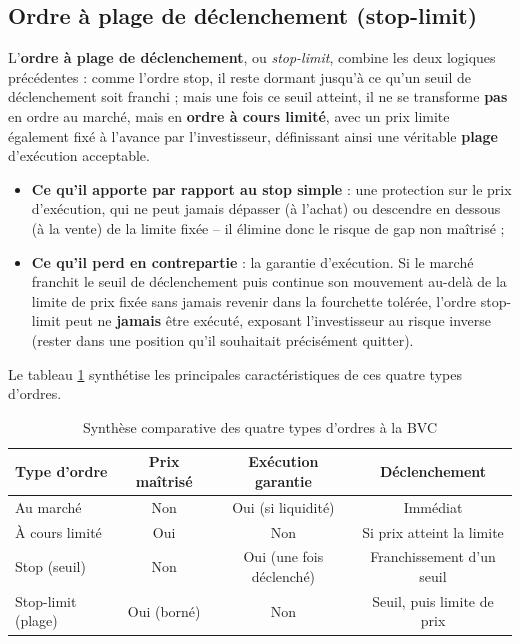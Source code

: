 \documentclass{rapportENSIAS} %
\begin{document}
\subsection{Ordre à plage de déclenchement (stop-limit)}

\noindent
L'\textbf{ordre à plage de déclenchement}, ou \textit{stop-limit}, combine les deux logiques précédentes : comme l'ordre stop, il reste dormant jusqu'à ce qu'un seuil de déclenchement soit franchi ; mais une fois ce seuil atteint, il ne se transforme \textbf{pas} en ordre au marché, mais en \textbf{ordre à cours limité}, avec un prix limite également fixé à l'avance par l'investisseur, définissant ainsi une véritable \textbf{plage} d'exécution acceptable.

\begin{itemize}
    \item \textbf{Ce qu'il apporte par rapport au stop simple} : une protection sur le prix d'exécution, qui ne peut jamais dépasser (à l'achat) ou descendre en dessous (à la vente) de la limite fixée -- il élimine donc le risque de gap non maîtrisé ;
    \item \textbf{Ce qu'il perd en contrepartie} : la garantie d'exécution. Si le marché franchit le seuil de déclenchement puis continue son mouvement au-delà de la limite de prix fixée sans jamais revenir dans la fourchette tolérée, l'ordre stop-limit peut ne \textbf{jamais} être exécuté, exposant l'investisseur au risque inverse (rester dans une position qu'il souhaitait précisément quitter).
\end{itemize}

\vspace{0.3cm}
\noindent
Le tableau \ref{tab:types-ordres} synthétise les principales caractéristiques de ces quatre types d'ordres.

\begin{table}[H]
\centering
\begin{tabular}{lccc}
\toprule
\textbf{Type d'ordre} & \textbf{Prix maîtrisé} & \textbf{Exécution garantie} & \textbf{Déclenchement} \\
\midrule
Au marché       & Non & Oui (si liquidité) & Immédiat \\
À cours limité  & Oui & Non                & Si prix atteint la limite \\
Stop (seuil)    & Non & Oui (une fois déclenché) & Franchissement d'un seuil \\
Stop-limit (plage) & Oui (borné) & Non     & Seuil, puis limite de prix \\
\bottomrule
\end{tabular}
\caption{Synthèse comparative des quatre types d'ordres à la BVC}
\label{tab:types-ordres}
\end{table}
\end{document}
